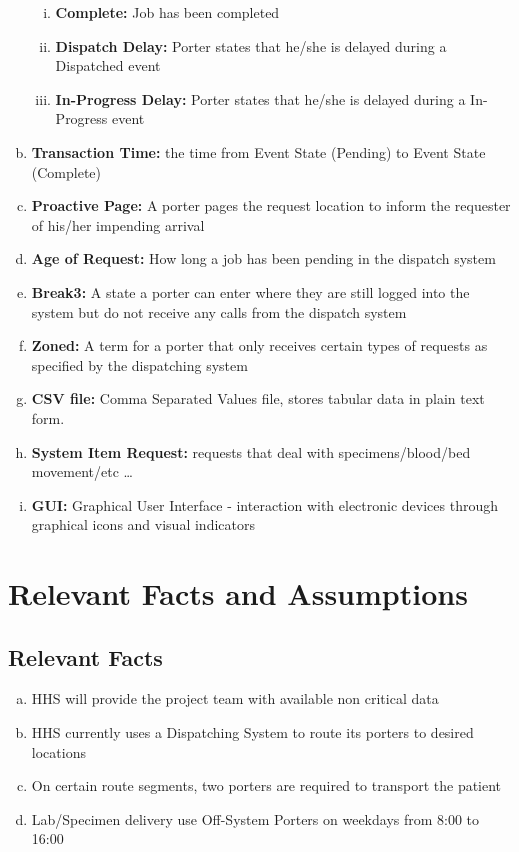 \documentclass[paper=letter, fontsize=10pt]{scrartcl}
\numberwithin{equation}{section}		%
\numberwithin{figure}{section}			%
\numberwithin{table}{section}				%
\begin{document}
\begin{enumerate}[(a)]
\begin{enumerate}[(i)]
		\item \textbf{Complete:} Job has been completed
		\item \textbf{Dispatch Delay:} Porter states that he/she is delayed during a Dispatched event
		\item \textbf{In-Progress Delay:} Porter states that he/she is delayed during a In-Progress event
	\end{enumerate} 
	\item \textbf{Transaction Time:} the time from Event State (Pending) to Event State (Complete)
	\item \textbf{Proactive Page:} A porter pages the request location to inform the requester of his/her impending arrival      
	\item \textbf{Age of Request:} How long a job has been pending in the dispatch system
	\item \textbf{Break3:} A state a porter can enter where they are still logged into the system but do not receive any calls from the dispatch system
	\item \textbf{Zoned:} A term for a porter that only receives certain types of requests as specified by the dispatching system 
	\item \textbf{CSV file:} Comma Separated Values file, stores tabular data in plain text form. 
	\item \textbf{System Item Request:} requests that deal with specimens/blood/bed movement/etc \ldots
	\item \textbf{GUI:} Graphical User Interface - interaction with electronic devices through graphical icons and visual indicators
\end{enumerate}

\section{Relevant Facts and Assumptions}
\subsection{Relevant Facts}
\begin{enumerate}[(a)]
	\item HHS will provide the project team with available non critical data
	\item HHS currently uses a Dispatching System to route its porters to desired locations
	\item On certain route segments, two porters are required to transport the patient 
	\item Lab/Specimen delivery use Off-System Porters on weekdays from 8:00 to 16:00
\end{enumerate}
\end{document}
